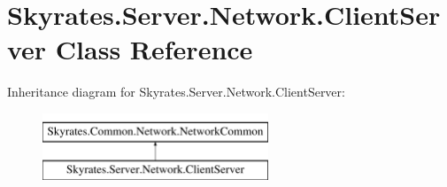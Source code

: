 \hypertarget{class_skyrates_1_1_server_1_1_network_1_1_client_server}{\section{Skyrates.\-Server.\-Network.\-Client\-Server Class Reference}
\label{class_skyrates_1_1_server_1_1_network_1_1_client_server}
}
Inheritance diagram for Skyrates.\-Server.\-Network.\-Client\-Server\-:\begin{figure}[H]
\begin{center}
\leavevmode
\includegraphics[height=2.000000cm]{class_skyrates_1_1_server_1_1_network_1_1_client_server}
\end{center}
\end{figure}
